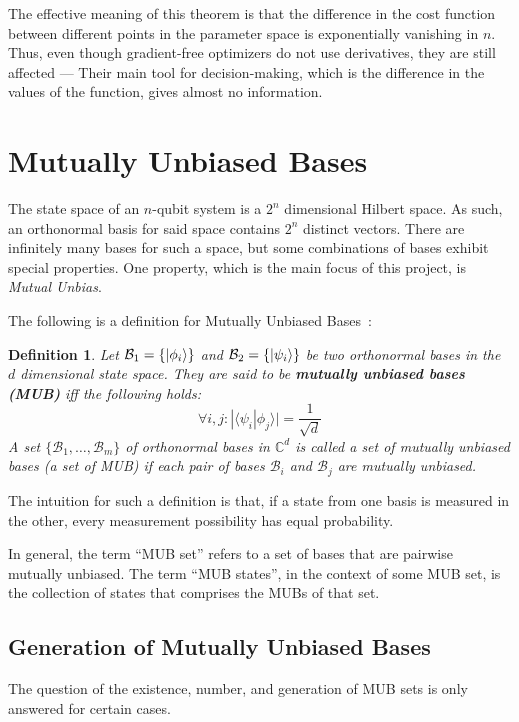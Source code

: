 \documentclass[a4paper,12pt]{article}
\newcommand{\base}{\mathcal{B}}
\newtheorem{definition}{Definition}
\begin{document}
The effective meaning of this theorem is that the difference in the cost function between different points in the parameter space is exponentially vanishing in $n$.
Thus, even though gradient-free optimizers do not use derivatives, they are still affected --- Their main tool for decision-making, which is the difference in the values of the function, gives almost no information.

\section{Mutually Unbiased Bases}
The state space of an $n$-qubit system is a $2^n$ dimensional Hilbert space.
As such, an orthonormal basis for said space contains $2^n$ distinct vectors.
There are infinitely many bases for such a space, but some combinations of bases exhibit special properties. One property, which is the main focus of this project, is \emph{Mutual Unbias}.

The following is a definition for Mutually Unbiased Bases~\cite{bandyopadhyay_new_2002}:
\begin{definition}
    Let $\base_1 = \{\ket{\phi_i}\}$ and $\base_2 = \{\ket{\psi_i}\}$ be two orthonormal bases in the $d$ dimensional state space.
    They are said to be \textbf{mutually unbiased bases (MUB)} iff the following holds:
    \begin{equation}
        \forall i,j : |\langle \psi_i | \phi_j \rangle | = \frac{1}{\sqrt{d}}
    \end{equation}
    A set $\{\base_1,\dots,\base_m\}$ of orthonormal bases in $\mathbb{C}^d$ is called a \emph{set of mutually unbiased bases} (a set of MUB) if each pair of bases $\base_i$ and $\base_j$ are mutually unbiased.
\end{definition}

The intuition for such a definition is that, if a state from one basis is measured in the other, every measurement possibility has equal probability.

In general, the term ``MUB set'' refers to a set of bases that are pairwise mutually unbiased.
The term ``MUB states'', in the context of some MUB set, is the collection of states that comprises the MUBs of that set.

\subsection{Generation of Mutually Unbiased Bases} \label{subsec:mub_gen}
The question of the existence, number, and generation of MUB sets is only answered for certain cases.
\end{document}
